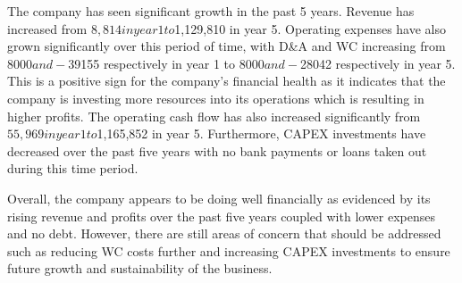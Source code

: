 

The company has seen significant growth in the past 5 years. Revenue has increased from $8,814 in year 1 to $1,129,810 in year 5. Operating expenses have also grown significantly over this period of time, with D&A and WC increasing from $8000 and -$39155 respectively in year 1 to $8000 and -$28042 respectively in year 5. This is a positive sign for the company's financial health as it indicates that the company is investing more resources into its operations which is resulting in higher profits. The operating cash flow has also increased significantly from $55,969 in year 1 to $1,165,852 in year 5. Furthermore, CAPEX investments have decreased over the past five years with no bank payments or loans taken out during this time period. 

Overall, the company appears to be doing well financially as evidenced by its rising revenue and profits over the past five years coupled with lower expenses and no debt. However, there are still areas of concern that should be addressed such as reducing WC costs further and increasing CAPEX investments to ensure future growth and sustainability of the business.